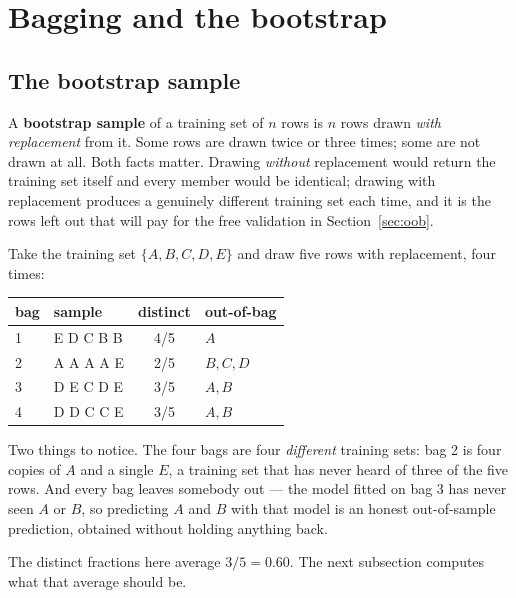 \documentclass[11pt]{article}
\begin{document}
\notesources{\AMLUnitVISources}

\section{Bagging and the bootstrap}
\label{sec:bag}

\subsection{The bootstrap sample}

A \textbf{bootstrap sample} of a training set of $n$ rows is $n$ rows drawn
\emph{with replacement} from it. Some rows are drawn twice or three times;
some are not drawn at all. Both facts matter. Drawing \emph{without}
replacement would return the training set itself and every member would be
identical; drawing with replacement produces a genuinely different training
set each time, and it is the rows left out that will pay for the free
validation in Section~\ref{sec:oob}.

\begin{worked}
Take the training set $\{A, B, C, D, E\}$ and draw five rows with replacement,
four times:
\begin{center}
\begin{tabular}{llcl}
  \toprule
  bag & sample & distinct & out-of-bag \\
  \midrule
  1 & E D C B B & 4/5 & $A$ \\
  2 & A A A A E & 2/5 & $B, C, D$ \\
  3 & D E C D E & 3/5 & $A, B$ \\
  4 & D D C C E & 3/5 & $A, B$ \\
  \bottomrule
\end{tabular}
\end{center}
Two things to notice. The four bags are four \emph{different} training sets:
bag 2 is four copies of $A$ and a single $E$, a training set that has never
heard of three of the five rows. And every bag leaves somebody out --- the
model fitted on bag 3 has never seen $A$ or $B$, so predicting $A$ and $B$
with that model is an honest out-of-sample prediction, obtained without
holding anything back.

The distinct fractions here average $3/5 = 0.60$. The next subsection
computes what that average should be.
\end{worked}
\end{document}

